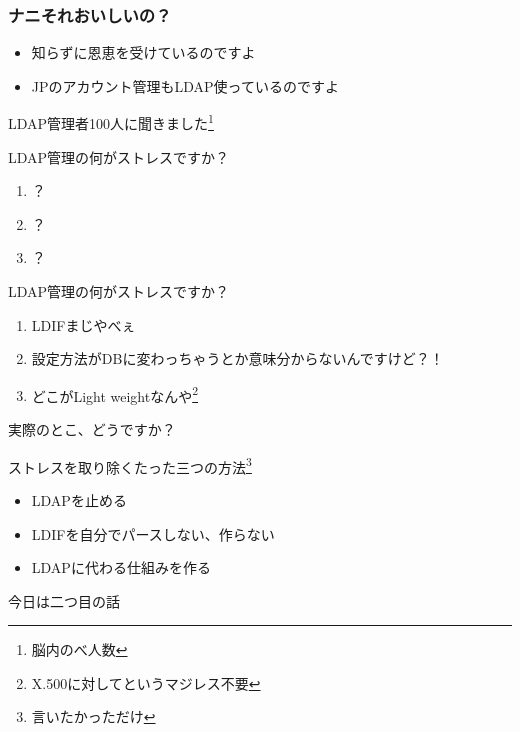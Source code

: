 \frame{\titlepage{}}


\begin{frame}
 \frametitle{ナニそれおいしいの？}
  \begin{itemize}
   \item 知らずに恩恵を受けているのですよ
   \item JPのアカウント管理もLDAP使っているのですよ
  \end{itemize}
\end{frame}

\begin{frame}
{\Huge LDAP管理者100人に聞きました\footnote{脳内のべ人数}}
\end{frame}

\begin{frame}{LDAP管理の何がストレスですか？}
 \begin{enumerate}
  \item ？
  \item ？
  \item ？
 \end{enumerate}
\end{frame}


\begin{frame}{LDAP管理の何がストレスですか？}
 \begin{enumerate}
  \item LDIFまじやべぇ
  \item 設定方法がDBに変わっちゃうとか意味分からないんですけど？！
  \item どこがLight weightなんや\footnote{X.500に対してというマジレス不要}
 \end{enumerate}
\end{frame}

\begin{frame}
{\Huge 実際のとこ、どうですか？}
\end{frame}

\begin{frame}{ストレスを取り除くたった三つの方法\footnote{言いたかっただけ}}
 \begin{itemize}
  \item LDAPを止める
  \item LDIFを自分でパースしない、作らない
  \item LDAPに代わる仕組みを作る
 \end{itemize}
\end{frame}

\begin{frame}
{\Huge 今日は二つ目の話}
\end{frame}

